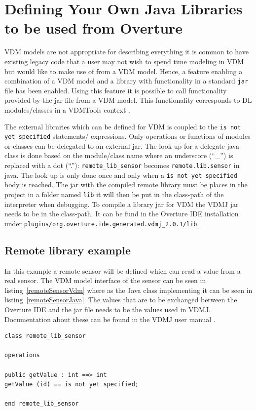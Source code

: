 \documentclass{overturerepchap}
\begin{document}
\chapter{Defining Your Own Java Libraries to be used from Overture}\label{sec:javalibs}

VDM models are not appropriate for describing everything it is common to have existing legacy code that a user may not
wish to spend time modeling in VDM but would like to make use of
from a VDM model. Hence, a feature enabling a combination of a VDM
model and a library with functionality in a standard \texttt{jar} file
has been enabled. Using this feature it is possible 
to call functionality provided by the jar file from a VDM model. This functionality
corresponds to DL modules/classes in a VDMTools context \cite{DLMan}.

The external libraries which can be defined for VDM is coupled to the
\texttt{is not yet specified} statements/ expressions. Only operations
or functions of modules or classes can be delegated to an external
jar. The look up for a delegate java class is done based on the
module/class name where an underscore (``\_'') is replaced with a dot
(``.''): \texttt{remote\_lib\_sensor} becomes
\texttt{remote.lib.sensor} in java. The look up is only done once and
only when a \texttt{is not yet specified} body is
reached. The jar with the compiled remote library must be places in
the project in a folder named \texttt{lib} it will then be put in the
class-path of the interpreter when debugging. To compile a library jar
for VDM the VDMJ jar needs to be in the class-path. It can be fund in
the Overture IDE installation under
\texttt{plugins/org.overture.ide.generated.vdmj\_2.0.1/lib}.

\section{Remote library example}

In this example a remote sensor will be defined which can read a
value from a real sensor. The VDM model interface of the sensor can be
seen in listing~\ref{remoteSensorVdm} where as the Java class
implementing it can be seen in listing~\ref{remoteSensorJava}. The
values that are to be exchanged between the Overture IDE and the jar
file needs to be the values used in VDMJ. Documentation about these
can be found in the VDMJ user manual \cite{Battle09}.

\begin{lstlisting}[language=VDM++,label=remoteSensorVdm,caption=Remote sensor VDM class,captionpos=b]
class remote_lib_sensor

operations

public getValue : int ==> int
getValue (id) == is not yet specified;

end remote_lib_sensor
\end{lstlisting}
\end{document}
